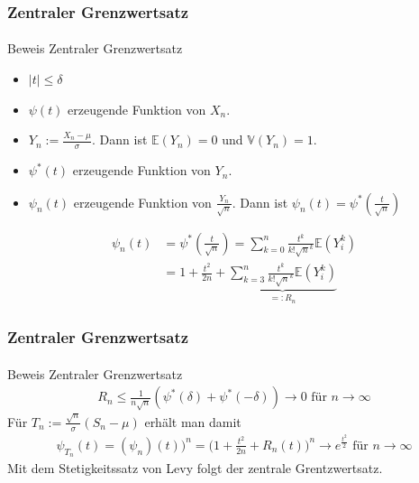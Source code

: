 \documentclass{beamer}
\begin{document}
\begin{frame}
    \frametitle{Zentraler Grenzwertsatz}
\framesubtitle{}

\begin{block}{Beweis Zentraler Grenzwertsatz}
\begin{itemize}
\item $|t| \leq \delta$
\item $\psi(t)$ erzeugende Funktion von $X_n$.
\item $Y_n := \frac{X_n - \mu}{\sigma}$. Dann ist $\mathbb{E}(Y_n) = 0$ und $\mathbb{V}(Y_n) = 1$.
\item $\psi^*(t)$ erzeugende Funktion von $Y_n$.
\item $\psi_n(t)$ erzeugende Funktion von $\frac{Y_n}{\sqrt{n}}$. Dann ist $\psi_n(t) = \psi^*(\frac{t}{\sqrt{n}})$ 
\end{itemize}
\begin{align*}
\psi_n(t) &= \psi^*(\frac{t}{\sqrt{n}}) =  \sum_{k= 0}^n \frac{t^k }{k! \sqrt{n}^k} \mathbb{E}(Y_i^k) \\
& = 1 + \frac{t^2}{2n} +  \underbrace{\sum_{k= 3}^n \frac{t^k }{k! \sqrt{n}^k} \mathbb{E}(Y_i^k)}_{=:R_n} 
\end{align*}
\end{block}

 \end{frame}



\begin{frame}
    \frametitle{Zentraler Grenzwertsatz}
\framesubtitle{}

\begin{block}{Beweis Zentraler Grenzwertsatz}
\begin{align*}
R_n \leq \frac{1}{n \sqrt{n}} (\psi^*(\delta)  + \psi^*(-\delta) ) \rightarrow 0  \text{ für } n \to \infty
\end{align*}
Für $T_n := \frac{\sqrt{n}}{\sigma}(S_n - \mu)$ erhält man damit
\begin{align*}
\psi_{T_n}(t) = (\psi_n)(t))^n = \biggl(  1 + \frac{t^2}{2n} + R_n(t) \biggr)^n \rightarrow e^{\frac{t^2}{2}} \text{ für } n \to \infty
\end{align*}
Mit dem Stetigkeitssatz von Levy folgt der zentrale Grentzwertsatz.
\end{block}

 \end{frame}
\end{document}
